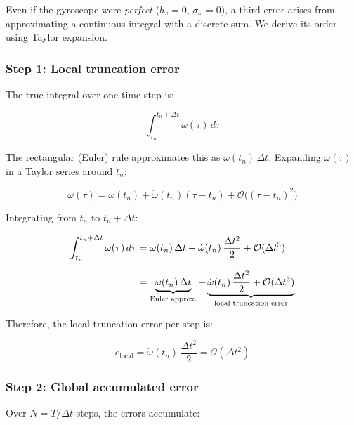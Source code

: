 Even if the gyroscope were \emph{perfect} ($b_\omega = 0$,
$\sigma_\omega = 0$), a third error arises from approximating a continuous
integral with a discrete sum. We derive its order using Taylor expansion.

\subsubsection{Step 1: Local truncation error}

The true integral over one time step is:

\begin{equation}
  \int_{t_n}^{t_n + \Delta t} \omega(\tau)\,d\tau
  \label{eq:app:true_step}
\end{equation}

\noindent The rectangular (Euler) rule approximates this as
$\omega(t_n)\,\Delta t$. Expanding $\omega(\tau)$ in a Taylor series around
$t_n$:

\begin{equation}
  \omega(\tau) = \omega(t_n) + \dot{\omega}(t_n)(\tau - t_n)
              + \mathcal{O}\bigl((\tau - t_n)^2\bigr)
  \label{eq:app:taylor}
\end{equation}

\noindent Integrating from $t_n$ to $t_n + \Delta t$:

\begin{align}
  \int_{t_n}^{t_n + \Delta t} \omega(\tau)\,d\tau
  &= \omega(t_n)\,\Delta t
   + \dot{\omega}(t_n)\,\frac{\Delta t^2}{2}
   + \mathcal{O}(\Delta t^3) \notag \\[6pt]
  &= \underbrace{\omega(t_n)\,\Delta t}_{\text{Euler approx.}}
   + \underbrace{\dot{\omega}(t_n)\,\frac{\Delta t^2}{2}
   + \mathcal{O}(\Delta t^3)}_{\text{local truncation error}}
  \label{eq:app:local_error}
\end{align}

\noindent Therefore, the local truncation error per step is:

\begin{equation}
  e_\text{local} = \dot{\omega}(t_n)\,\frac{\Delta t^2}{2}
                 = \mathcal{O}(\Delta t^2)
  \label{eq:app:local_order}
\end{equation}

\subsubsection{Step 2: Global accumulated error}

Over $N = T/\Delta t$ steps, the errors accumulate:

